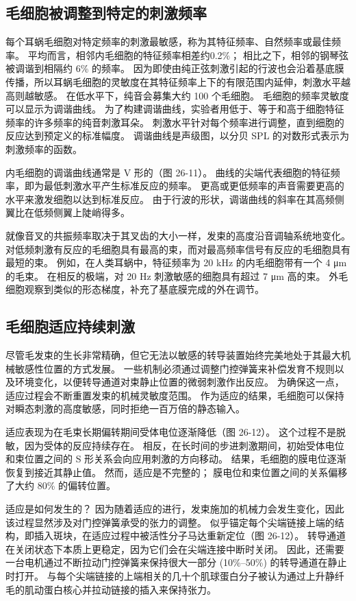 \subsection{毛细胞被调整到特定的刺激频率}
每个耳蜗毛细胞对特定频率的刺激最敏感，称为其特征频率、自然频率或最佳频率。 平均而言，相邻内毛细胞的特征频率相差约0.2\%； 相比之下，相邻的钢琴弦被调谐到相隔约 6\% 的频率。 因为即使由纯正弦刺激引起的行波也会沿着基底膜传播，所以耳蜗毛细胞的灵敏度在其特征频率上下的有限范围内延伸，刺激水平越高则越敏感。 在低水平下，纯音会募集大约 100 个毛细胞。 毛细胞的频率灵敏度可以显示为调谐曲线。 为了构建调谐曲线，实验者用低于、等于和高于细胞特征频率的许多频率的纯音刺激耳朵。 刺激水平针对每个频率进行调整，直到细胞的反应达到预定义的标准幅度。 调谐曲线是声级图，以分贝 SPL 的对数形式表示为刺激频率的函数。

内毛细胞的调谐曲线通常是 V 形的（图 26-11）。 曲线的尖端代表细胞的特征频率，即为最低刺激水平产生标准反应的频率。 更高或更低频率的声音需要更高的水平来激发细胞以达到标准反应。 由于行波的形状，调谐曲线的斜率在其高频侧翼比在低频侧翼上陡峭得多。

就像音叉的共振频率取决于其叉齿的大小一样，发束的高度沿音调轴系统地变化。 对低频刺激有反应的毛细胞具有最高的束，而对最高频率信号有反应的毛细胞具有最短的束。 例如，在人类耳蜗中，特征频率为 20 kHz 的内毛细胞带有一个 4 μm 的毛束。 在相反的极端，对 20 Hz 刺激敏感的细胞具有超过 7 μm 高的束。 外毛细胞观察到类似的形态梯度，补充了基底膜完成的外在调节。

\subsection{毛细胞适应持续刺激}
尽管毛发束的生长非常精确，但它无法以敏感的转导装置始终完美地处于其最大机械敏感性位置的方式发展。 一些机制必须通过调整门控弹簧来补偿发育不规则以及环境变化，以便转导通道对束静止位置的微弱刺激作出反应。 为确保这一点，适应过程会不断重置发束的机械灵敏度范围。 作为适应的结果，毛细胞可以保持对瞬态刺激的高度敏感，同时拒绝一百万倍的静态输入。

适应表现为在毛束长期偏转期间受体电位逐渐降低（图 26-12）。 这个过程不是脱敏，因为受体的反应持续存在。 相反，在长时间的步进刺激期间，初始受体电位和束位置之间的 S 形关系会向应用刺激的方向移动。 结果，毛细胞的膜电位逐渐恢复到接近其静止值。 然而，适应是不完整的； 膜电位和束位置之间的关系偏移了大约 80\% 的偏转位置。

适应是如何发生的？ 因为随着适应的进行，发束施加的机械力会发生变化，因此该过程显然涉及对门控弹簧承受的张力的调整。 似乎锚定每个尖端链接上端的结构，即插入斑块，在适应过程中被活性分子马达重新定位（图 26-12）。 转导通道在关闭状态下本质上更稳定，因为它们会在尖端连接中断时关闭。 因此，还需要一台电机通过不断拉动门控弹簧来保持很大一部分 (10\%–50\%) 的转导通道在静止时打开。 与每个尖端链接的上端相关的几十个肌球蛋白分子被认为通过上升静纤毛的肌动蛋白核心并拉动链接的插入来保持张力。

